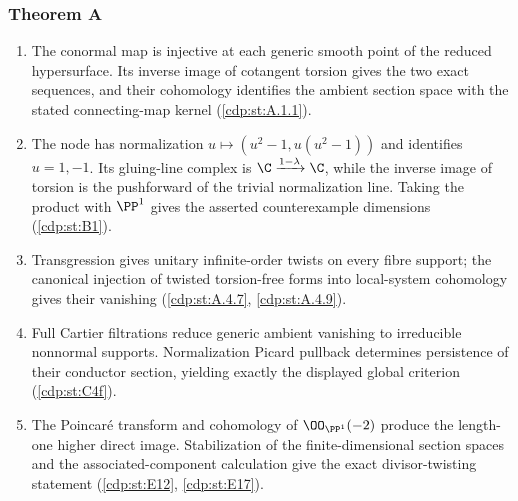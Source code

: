 \hypertarget{outline-II-A}{}
\subsubsection*{Theorem A}
\begin{enumerate}[label=\arabic*.,leftmargin=*]
\item\hypertarget{step-II-A-1}{} The conormal map is injective at
each generic smooth point of the reduced hypersurface. Its inverse
image of cotangent torsion gives the two exact sequences, and their
cohomology identifies the ambient section space with the stated
connecting-map kernel
(\hyperref[cdp:st:A.1.1]{\ref*{cdp:st:A.1.1}}).
\item\hypertarget{step-II-A-2}{} The node has normalization
$u\mapsto(u^2-1,u(u^2-1))$ and identifies $u=1,-1$. Its gluing-line
complex is $\C\xrightarrow{1-\lambda}\C$, while the inverse
image of torsion is the pushforward of the trivial normalization
line. Taking the product with $\PP^1$ gives the asserted
counterexample dimensions
(\hyperref[cdp:st:B1]{\ref*{cdp:st:B1}}).
\item\hypertarget{step-II-A-3}{} Transgression gives unitary
infinite-order twists on every fibre support; the canonical
injection of twisted torsion-free forms into local-system
cohomology gives their vanishing
(\hyperref[cdp:st:A.4.7]{\ref*{cdp:st:A.4.7}},
\hyperref[cdp:st:A.4.9]{\ref*{cdp:st:A.4.9}}).
\item\hypertarget{step-II-A-4}{} Full Cartier filtrations reduce
generic ambient vanishing to irreducible nonnormal supports.
Normalization Picard pullback determines persistence of their
conductor section, yielding exactly the displayed global
criterion (\hyperref[cdp:st:C4f]{\ref*{cdp:st:C4f}}).
\item\hypertarget{step-II-A-5}{} The Poincar\'e transform and
cohomology of $\OO_{\PP^1}(-2)$ produce the length-one higher
direct image. Stabilization of the finite-dimensional section
spaces and the associated-component calculation give the exact
divisor-twisting statement
(\hyperref[cdp:st:E12]{\ref*{cdp:st:E12}},
\hyperref[cdp:st:E17]{\ref*{cdp:st:E17}}).
\end{enumerate}

\hypertarget{outline-II-B}{}
